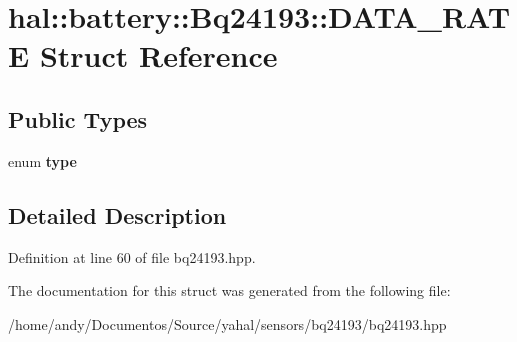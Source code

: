 \hypertarget{structhal_1_1battery_1_1_bq24193_1_1_d_a_t_a___r_a_t_e}{}\section{hal\+:\+:battery\+:\+:Bq24193\+:\+:D\+A\+T\+A\+\_\+\+R\+A\+T\+E Struct Reference}
\label{structhal_1_1battery_1_1_bq24193_1_1_d_a_t_a___r_a_t_e}
\subsection*{Public Types}
\begin{DoxyCompactItemize}
\item 
\hypertarget{structhal_1_1battery_1_1_bq24193_1_1_d_a_t_a___r_a_t_e_ad312cb38ca9fc66e0f669d12721568ea}{}enum {\bfseries type} \label{structhal_1_1battery_1_1_bq24193_1_1_d_a_t_a___r_a_t_e_ad312cb38ca9fc66e0f669d12721568ea}

\end{DoxyCompactItemize}


\subsection{Detailed Description}


Definition at line 60 of file bq24193.\+hpp.



The documentation for this struct was generated from the following file\+:\begin{DoxyCompactItemize}
\item 
/home/andy/\+Documentos/\+Source/yahal/sensors/bq24193/bq24193.\+hpp\end{DoxyCompactItemize}
